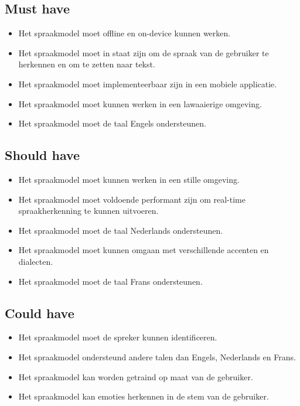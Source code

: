 \subsection{Must have}

\begin{itemize}
  \item Het spraakmodel moet offline en on-device kunnen werken.
  \item Het spraakmodel moet in staat zijn om de spraak van de gebruiker te herkennen en om te zetten naar tekst.
  \item Het spraakmodel moet implementeerbaar zijn in een mobiele applicatie.
  \item Het spraakmodel moet kunnen werken in een lawaaierige omgeving.
  \item Het spraakmodel moet de taal Engels ondersteunen.
\end{itemize}

\subsection{Should have}

\begin{itemize}
  \item Het spraakmodel moet kunnen werken in een stille omgeving.
  \item Het spraakmodel moet voldoende performant zijn om real-time spraakherkenning te kunnen uitvoeren.
  \item Het spraakmodel moet de taal Nederlands ondersteunen.
  \item Het spraakmodel moet kunnen omgaan met verschillende accenten en dialecten.
  \item Het spraakmodel moet de taal Frans ondersteunen.
\end{itemize}

\subsection{Could have}

\begin{itemize}
  \item Het spraakmodel moet de spreker kunnen identificeren.
  \item Het spraakmodel ondersteund andere talen dan Engels, Nederlands en Frans.
  \item Het spraakmodel kan worden getraind op maat van de gebruiker.
  \item Het spraakmodel kan emoties herkennen in de stem van de gebruiker.
\end{itemize}

